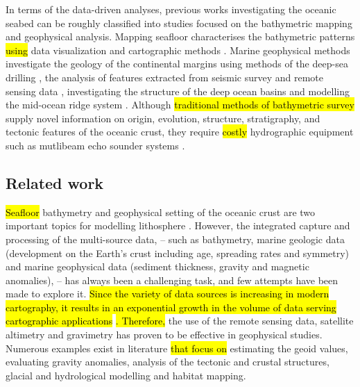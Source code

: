 \documentclass[geomatics,article,submit,pdftex,moreauthors]{Definitions/mdpi}
\begin{document}
In terms of the data-driven analyses, previous works investigating the oceanic seabed can be roughly classified into studies focused on the bathymetric mapping and geophysical analysis. Mapping seafloor\hl{ }characterises the bathymetric patterns \hl{using }data visualization and\hl{ }cartographic methods \cite{Battista,Lemenkova202105,Lemenkova202012}. Marine geophysical methods\hl{ }investigate the geology of the continental margins using methods of the deep-sea drilling \cite{Schlich1992TheGA,Veevers1991a}, the analysis of features extracted from seismic survey and remote sensing data \cite{NEGI2022229330}, investigating the structure of the deep ocean basins \cite{BENARD2010633,RAMANA2001241,DAVIS201616} and modelling the mid-ocean ridge system\hl{ } \cite{FREY200073,Sreejith,Lemenkova202112}. Although \hl{traditional methods of bathymetric survey } supply novel information on origin, evolution, structure, stratigraphy, and tectonic features of the oceanic crust, they\hl{ }require \hl{costly} hydrographic equipment such as mutlibeam echo sounder systems\hl{ }\cite{Falvey}.

\subsection{Related work}

\hl{Seafloor} bathymetry and geophysical setting of the oceanic crust are two important topics for modelling lithosphere \cite{WATSON201697}. However, the integrated capture and processing of the multi-source data, -- such as bathymetry, marine geologic data (development on the Earth's crust including age, spreading rates and symmetry) and marine geophysical data (sediment thickness, gravity and magnetic anomalies), -- has always been a challenging task, and few attempts have been made to explore it. \hl{Since the variety of data sources is increasing in modern cartography, it results in an exponential growth in the volume of data serving cartographic applications} \cite{LEE199121}\hl{. Therefore, }the use of the remote sensing data, satellite altimetry and gravimetry has proven to be effective in geophysical\hl{ }studies. Numerous examples exist in\hl{ }literature \hl{that focus on} estimating the geoid values, evaluating gravity anomalies, analysis of the tectonic and crustal structures, glacial and hydrological modelling and habitat mapping. 
\end{document}
